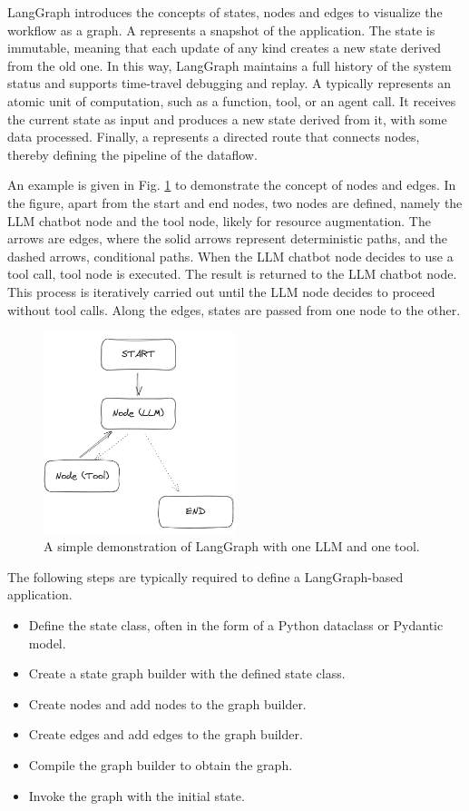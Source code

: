 LangGraph introduces the concepts of states, nodes and edges to visualize the workflow as a graph. A  represents a snapshot of the application. The state is immutable, meaning that each update of any kind creates a new state derived from the old one. In this way, LangGraph maintains a full history of the system status and supports time-travel debugging and replay. A  typically represents an atomic unit of computation, such as a function, tool, or an agent call. It receives the current state as input and produces a new state derived from it, with some data processed. Finally, a  represents a directed route that connects nodes, thereby defining the pipeline of the dataflow.

An example is given in Fig. \ref{fig:langgraph_simpledemo} to demonstrate the concept of nodes and edges. In the figure, apart from the start and end nodes, two nodes are defined, namely the LLM chatbot node and the tool node, likely for resource augmentation. The arrows are edges, where the solid arrows represent deterministic paths, and the dashed arrows, conditional paths. When the LLM chatbot node decides to use a tool call, tool node is executed. The result is returned to the LLM chatbot node. This process is iteratively carried out until the LLM node decides to proceed without tool calls. Along the edges, states are passed from one node to the other.

\begin{figure}[!htb]
	\centering
	\includegraphics[width=0.5\textwidth]{./chapters/part-7/figures/langgraph_simpledemo.png}
	\caption{A simple demonstration of LangGraph with one LLM and one tool.}
	\label{fig:langgraph_simpledemo}
\end{figure}

The following steps are typically required to define a LangGraph-based application.
\begin{itemize}
  \item Define the state class, often in the form of a Python dataclass or Pydantic model.
  \item Create a state graph builder with the defined state class.
  \item Create nodes and add nodes to the graph builder.
  \item Create edges and add edges to the graph builder.
  \item Compile the graph builder to obtain the graph.
  \item Invoke the graph with the initial state.
\end{itemize}

